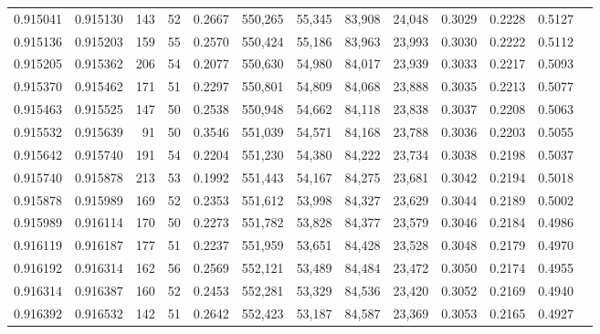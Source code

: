\begin{tabular}{rrrrrrrrrrrrr}
0.915041 & 0.915130 &   143 &  52 &                                     0.2667 & 550,265 &  55,345 &  83,908 &  24,048 & 0.3029 & 0.2228 & 0.5127 \\
0.915136 & 0.915203 &   159 &  55 &                                     0.2570 & 550,424 &  55,186 &  83,963 &  23,993 & 0.3030 & 0.2222 & 0.5112 \\
0.915205 & 0.915362 &   206 &  54 &                                     0.2077 & 550,630 &  54,980 &  84,017 &  23,939 & 0.3033 & 0.2217 & 0.5093 \\
0.915370 & 0.915462 &   171 &  51 &                                     0.2297 & 550,801 &  54,809 &  84,068 &  23,888 & 0.3035 & 0.2213 & 0.5077 \\
0.915463 & 0.915525 &   147 &  50 &                                     0.2538 & 550,948 &  54,662 &  84,118 &  23,838 & 0.3037 & 0.2208 & 0.5063 \\
0.915532 & 0.915639 &    91 &  50 &                                     0.3546 & 551,039 &  54,571 &  84,168 &  23,788 & 0.3036 & 0.2203 & 0.5055 \\
0.915642 & 0.915740 &   191 &  54 &                                     0.2204 & 551,230 &  54,380 &  84,222 &  23,734 & 0.3038 & 0.2198 & 0.5037 \\
0.915740 & 0.915878 &   213 &  53 &                                     0.1992 & 551,443 &  54,167 &  84,275 &  23,681 & 0.3042 & 0.2194 & 0.5018 \\
0.915878 & 0.915989 &   169 &  52 &                                     0.2353 & 551,612 &  53,998 &  84,327 &  23,629 & 0.3044 & 0.2189 & 0.5002 \\
0.915989 & 0.916114 &   170 &  50 &                                     0.2273 & 551,782 &  53,828 &  84,377 &  23,579 & 0.3046 & 0.2184 & 0.4986 \\
0.916119 & 0.916187 &   177 &  51 &                                     0.2237 & 551,959 &  53,651 &  84,428 &  23,528 & 0.3048 & 0.2179 & 0.4970 \\
0.916192 & 0.916314 &   162 &  56 &                                     0.2569 & 552,121 &  53,489 &  84,484 &  23,472 & 0.3050 & 0.2174 & 0.4955 \\
0.916314 & 0.916387 &   160 &  52 &                                     0.2453 & 552,281 &  53,329 &  84,536 &  23,420 & 0.3052 & 0.2169 & 0.4940 \\
0.916392 & 0.916532 &   142 &  51 &                                     0.2642 & 552,423 &  53,187 &  84,587 &  23,369 & 0.3053 & 0.2165 & 0.4927 \\

\end{tabular}
